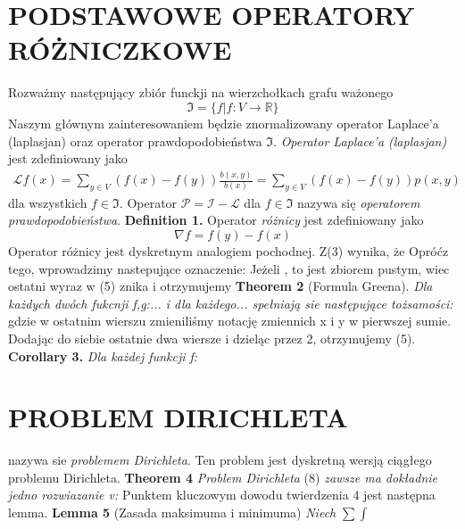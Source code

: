 \documentclass[a4paper,12pkt]{amsart}
\begin{document}
\section{PODSTAWOWE OPERATORY RÓŻNICZKOWE} 
\indent Rozważmy następujący zbiór funckji na wierzchołkach grafu ważonego
$$\Im = \{f|f: V \rightarrow \mathbb{R}\}$$\newline 
\indent  Naszym głównym zainteresowaniem będzie znormalizowany operator Laplace'a (laplasjan) oraz operator prawdopodobieństwa $\Im$. \textit{Operator Laplace'a (laplasjan)} jest zdefiniowany jako 
\begin{eqnarray} 
\mathcal{L}f(x) = \sum_{y \in V} (f(x) - f(y)) \frac{b(x,y)}{b(x)}= \sum_{y \in V} (f(x) - f(y))p(x,y) 
\end{eqnarray} 
dla wszystkich $f \in \Im$.\newline 
\indent Operator $\mathcal{P= I - L}$ dla $f \in \Im$ nazywa się \textit{operatorem prawdopodobieństwa}. \newline
\newline
\textbf{Definition 1.} Operator \textit{różnicy} jest zdefiniowany jako \newline
$$\nabla f = f(y) - f(x)$$ \newline
Operator różnicy jest dyskretnym analogiem pochodnej. Z(3) wynika, że \newline
Opróćz tego, wprowadzimy nastepujące oznaczenie: \newline
\indent Jeżeli , to  jest zbiorem pustym, wiec ostatni wyraz w (5) znika i otrzymujemy \newline
\textbf{Theorem 2} (Formula Greena). \textit {Dla każdych dwóch fukcnji f,g:...  i dla każdego...  spełniają sie następujące tożsamości:} \newline
gdzie w ostatnim wierszu zmieniliśmy notację zmiennich x i y w pierwszej sumie. Dodając do siebie ostatnie dwa wiersze i dzieląc przez 2, otrzymujemy (5).\newline
\textbf{ Corollary 3.} \textit{Dla każdej funkcji f:}\newline
\section{PROBLEM DIRICHLETA}
\indent nazywa sie \textit{problemem Dirichleta}. Ten problem jest dyskretną wersją ciągłego problemu Dirichleta. \newline
\newline
\textbf{Theorem 4} \textit{Problem Dirichleta }(8)\textit{ zawsze ma dokładnie jedno rozwiazanie v:} \newline
\indent Punktem kluczowym dowodu twierdzenia 4 jest następna lemma.\newline
\textbf{Lemma 5} (Zasada maksimuma i minimuma) \textit {Niech} $\sum \int$
\end{document}
